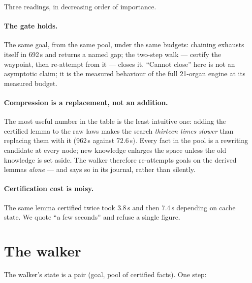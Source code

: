 \documentclass[11pt]{article}
\theoremstyle{remark}\newtheorem{remark}{Remark}
\begin{document}
Three readings, in decreasing order of importance.

\paragraph{The gate holds.} The same goal, from the same pool, under the same
budgets: chaining exhausts itself in 692\,s and returns a named gap; the
two-step walk --- certify the waypoint, then re-attempt from it --- closes it.
``Cannot close'' here is not an asymptotic claim; it is the measured behaviour
of the full 21-organ engine at its measured budget.

\paragraph{Compression is a replacement, not an addition.} The most useful
number in the table is the least intuitive one: adding the certified lemma to
the raw laws makes the search \emph{thirteen times slower} than replacing them
with it (962\,s against 72.6\,s). Every fact in the pool is a rewriting
candidate at every node; new knowledge enlarges the space unless the old
knowledge is set aside. The walker therefore re-attempts goals on the derived
lemmas \emph{alone} --- and says so in its journal, rather than silently.

\paragraph{Certification cost is noisy.} The same lemma certified twice took
3.8\,s and then 7.4\,s depending on cache state. We quote ``a few seconds''
and refuse a single figure.

\section{The walker}
\label{sec:marcheur}

The walker's state is a pair (goal, pool of certified facts). One step:
\end{document}
